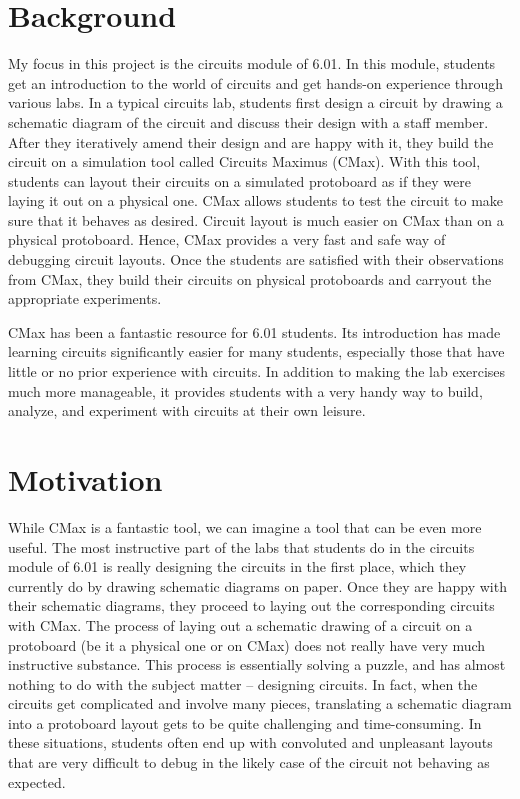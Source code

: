 \documentclass[12pt, doublespacing]{amsart}
\begin{document}
\section{Background}
\label{sec:background}

My focus in this project is the circuits module of 6.01. In this module, students get an introduction to the world of circuits and get hands-on experience through various labs. In a typical circuits lab, students first design a circuit by drawing a schematic diagram of the circuit and discuss their design with a staff member. After they iteratively amend their design and are happy with it, they build the circuit on a simulation tool called Circuits Maximus (CMax)\cite{cmax}. With this tool, students can layout their circuits on a simulated protoboard as if they were laying it out on a physical one. CMax allows students to test the circuit to make sure that it behaves as desired. Circuit layout is much easier on CMax than on a physical protoboard. Hence, CMax provides a very fast and safe way of debugging circuit layouts. Once the students are satisfied with their observations from CMax, they build their circuits on physical protoboards and carryout the appropriate experiments.

CMax has been a fantastic resource for 6.01 students. Its introduction has made learning circuits significantly easier for many students, especially those that have little or no prior experience with circuits. In addition to making the lab exercises much more manageable, it provides students with a very handy way to build, analyze, and experiment with circuits at their own leisure.

\section{Motivation}
\label{sec:motivation}

While CMax is a fantastic tool, we can imagine a tool that can be even more useful. The most instructive part of the labs that students do in the circuits module of 6.01 is really designing the circuits in the first place, which they currently do by drawing schematic diagrams on paper. Once they are happy with their schematic diagrams, they proceed to laying out the corresponding circuits with CMax. The process of laying out a schematic drawing of a circuit on a protoboard (be it a physical one or on CMax) does not really have very much instructive substance. This process is essentially solving a puzzle, and has almost nothing to do with the subject matter -- designing circuits. In fact, when the circuits get complicated and involve many pieces, translating a schematic diagram into a protoboard layout gets to be quite challenging and time-consuming. In these situations, students often end up with convoluted and unpleasant layouts that are very difficult to debug in the likely case of the circuit not behaving as expected.
\end{document}

